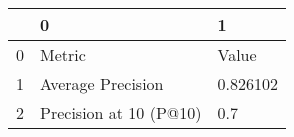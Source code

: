 \begin{tabular}{lll}
\toprule
{} &                       0 &         1 \\
\midrule
0 &                  Metric &     Value \\
1 &       Average Precision &  0.826102 \\
2 &  Precision at 10 (P@10) &       0.7 \\
\bottomrule
\end{tabular}
